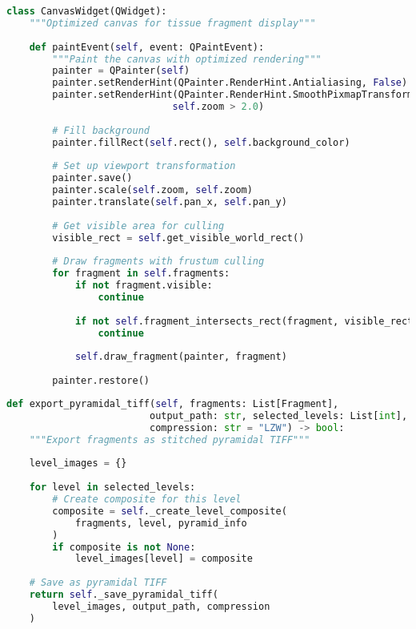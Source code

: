 \documentclass[12pt,a4paper]{report}
\begin{document}
\begin{lstlisting}[language=Python, caption=Canvas Widget - Rendu haute performance]
class CanvasWidget(QWidget):
    """Optimized canvas for tissue fragment display"""
    
    def paintEvent(self, event: QPaintEvent):
        """Paint the canvas with optimized rendering"""
        painter = QPainter(self)
        painter.setRenderHint(QPainter.RenderHint.Antialiasing, False)
        painter.setRenderHint(QPainter.RenderHint.SmoothPixmapTransform, 
                             self.zoom > 2.0)
        
        # Fill background
        painter.fillRect(self.rect(), self.background_color)
        
        # Set up viewport transformation
        painter.save()
        painter.scale(self.zoom, self.zoom)
        painter.translate(self.pan_x, self.pan_y)
        
        # Get visible area for culling
        visible_rect = self.get_visible_world_rect()
        
        # Draw fragments with frustum culling
        for fragment in self.fragments:
            if not fragment.visible:
                continue
            
            if not self.fragment_intersects_rect(fragment, visible_rect):
                continue
                
            self.draw_fragment(painter, fragment)
        
        painter.restore()
\end{lstlisting}

\begin{lstlisting}[language=Python, caption=Exportation pyramidale - Gestion multi-niveaux]
def export_pyramidal_tiff(self, fragments: List[Fragment], 
                         output_path: str, selected_levels: List[int],
                         compression: str = "LZW") -> bool:
    """Export fragments as stitched pyramidal TIFF"""
    
    level_images = {}
    
    for level in selected_levels:
        # Create composite for this level
        composite = self._create_level_composite(
            fragments, level, pyramid_info
        )
        if composite is not None:
            level_images[level] = composite
    
    # Save as pyramidal TIFF
    return self._save_pyramidal_tiff(
        level_images, output_path, compression
    )
\end{lstlisting}
\end{document}
